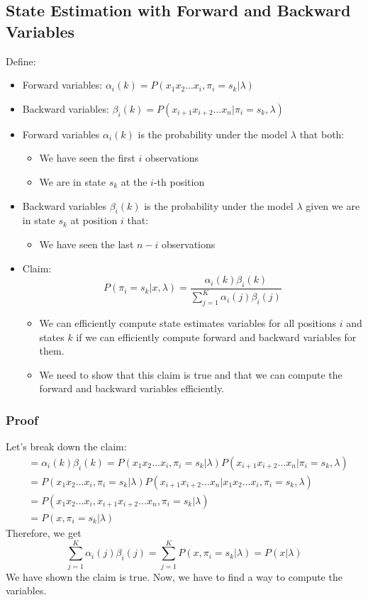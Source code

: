 \documentclass[10pt]{article}
\begin{document}
\subsection*{State Estimation with Forward and Backward Variables}
Define:
\begin{itemize}
	\item Forward variables: $\alpha_i(k) = P(x_1 x_2 \dots x_i, \pi_i = s_k | \lambda)$
	\item Backward variables: $\beta_i(k) = P(x_{i + 1} x_{i + 2} \dots x_n | \pi_i = s_k, \lambda)$
	\item Forward variables $\alpha_i(k)$ is the probability under the model $\lambda$ that both:
	\begin{itemize}
        \item We have seen the first $i$ observations
        \item We are in state $s_k$ at the $i$-th position
    \end{itemize}
    \item Backward variables $\beta_i(k)$ is the probability under the model $\lambda$ given we are in state $s_k$ at position $i$ that:
    \begin{itemize}
        \item We have seen the last $n - i$ observations
    \end{itemize}
    \item Claim:
    \[P(\pi_i = s_k | x, \lambda) = \frac{\alpha_i(k) \beta_i(k)}{\sum_{j = 1}^K \alpha_i(j) \beta_i(j)}\]
    \begin{itemize}
        \item We can efficiently compute state estimates variables for all positions $i$ and states $k$ if we can efficiently compute forward and backward variables for them.
        \item We need to show that this claim is true and that we can compute the forward and backward variables efficiently.
    \end{itemize}
\end{itemize}
\subsubsection*{Proof}
Let's break down the claim:
\begin{align*}
    &= \alpha_i(k) \beta_i(k) = P(x_1 x_2 \dots x_i, \pi_i = s_k|\lambda) P(x_{i + 1} x_{i + 2} \dots x_n | \pi_i = s_k, \lambda)\\
    &=P(x_1 x_2 \dots x_i, \pi_i = s_k | \lambda) P(x_{i + 1} x_{i + 2} \dots x_n | x_1 x_2 \dots x_i, \pi_i = s_k, \lambda)\\
    &= P(x_1 x_2 \dots x_i, x_{i + 1} x_{i + 2} \dots x_n, \pi_i = s_k | \lambda)\\
    &= P(x, \pi_i = s_k | \lambda)
\end{align*}
Therefore, we get
\[\sum_{j = 1}^K \alpha_i(j) \beta_i(j) = \sum_{j = 1}^K P(x, \pi_i = s_k | \lambda) = P(x | \lambda)\]
We have shown the claim is true.  Now, we have to find a way to compute the variables.
\end{document}

